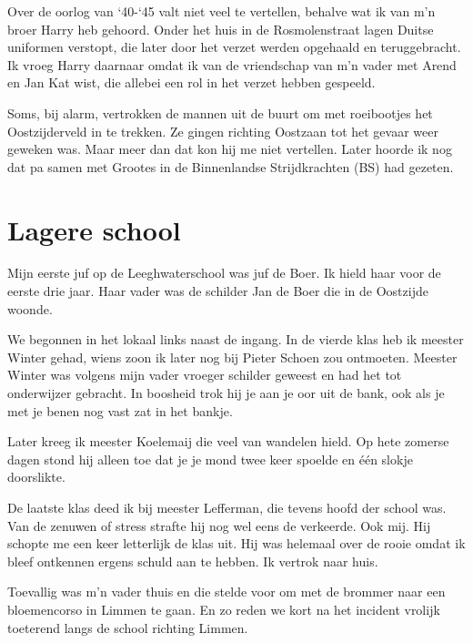 \documentclass[12pt,twoside, openright]{memoir}
\begin{document}
Over de oorlog van `40-`45 valt niet veel te vertellen, behalve wat ik van m’n broer Harry heb gehoord. Onder het huis in de Rosmolenstraat lagen Duitse uniformen verstopt, die later door het verzet werden opgehaald en teruggebracht. Ik vroeg Harry daarnaar omdat ik van de vriendschap van m’n vader met Arend en Jan Kat wist, die allebei een rol in het verzet hebben gespeeld. 

Soms, bij alarm, vertrokken de mannen uit de buurt om met roeibootjes het Oostzijderveld in te trekken. Ze gingen richting Oostzaan tot het gevaar weer geweken was. Maar meer dan dat kon hij me niet vertellen. Later hoorde ik nog dat pa samen met Grootes in de Binnenlandse Strijdkrachten (BS) had gezeten.

\chapter{Lagere school} %
\label{cha:lagere_school}

Mijn eerste juf op de Leeghwaterschool was juf de Boer. Ik hield haar voor de eerste drie jaar. Haar vader was de schilder Jan de Boer die in de Oostzijde woonde. 

We begonnen in het lokaal links naast de ingang. In de vierde klas heb ik meester Winter gehad, wiens zoon ik later nog bij Pieter Schoen zou ontmoeten. Meester Winter was volgens mijn vader vroeger schilder geweest en had het tot onderwijzer gebracht. In boosheid trok hij je aan je oor uit de bank, ook als je met je benen nog vast zat in het bankje. 

Later kreeg ik meester Koelemaij die veel van wandelen hield. Op hete zomerse dagen stond hij alleen toe dat je je mond twee keer spoelde en één slokje doorslikte. 

De laatste klas deed ik bij meester Lefferman, die tevens hoofd der school was. Van de zenuwen of stress strafte hij nog wel eens de verkeerde. Ook mij. Hij schopte me een keer letterlijk de klas uit. Hij was helemaal over de rooie omdat ik bleef ontkennen ergens schuld aan te hebben. Ik vertrok naar huis. 

Toevallig was m’n vader thuis en die stelde voor om met de brommer naar een bloemencorso in Limmen te gaan. En zo reden we kort na het incident vrolijk toeterend langs de school richting Limmen. 
\end{document}
